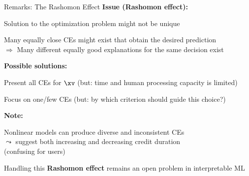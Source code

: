 \documentclass[10pt,compress,t,notes=noshow, xcolor=table]{beamer}
\begin{document}
\begin{framev}[align=top]{Remarks: The Rashomon Effect}
\textbf{Issue (\textbf{Rashomon effect}):}
\begin{itemizeM}
\item Solution to the optimization problem might not be unique
\item Many equally close CEs might exist that obtain the desired prediction\\
$\Rightarrow$ Many different equally good explanations for the same decision exist
\end{itemizeM}
\pause
\spacer[0.25]
\textbf{Possible solutions:}
\begin{itemizeM}
\item Present all CEs for $\xv$ (but: time and human processing capacity is limited)
\item Focus on one/few CEs (but: by which criterion should guide this choice?)
\end{itemizeM}
\pause
\spacer[0.25]
\textbf{Note:}
\begin{itemizeM}
\item Nonlinear models can produce diverse and inconsistent CEs\\
$\leadsto$ suggest both increasing and decreasing credit duration\\
(confusing for users)
\item Handling this \textbf{Rashomon effect} remains an open problem in interpretable ML
\end{itemizeM}
\end{framev}
\end{document}
